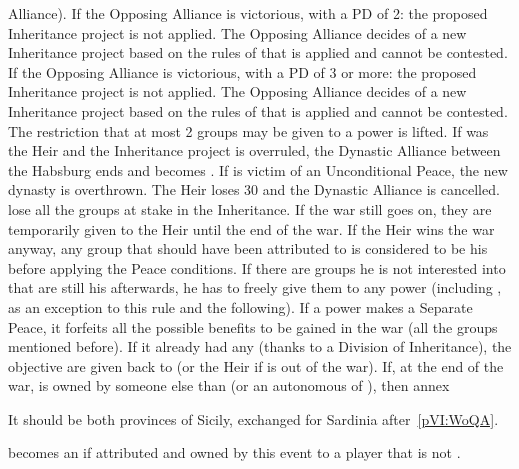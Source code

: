 \begin{digressions}
  Alliance).
  \aparag If the Opposing Alliance is victorious, with a PD of 2: the proposed
  Inheritance project is not applied. The Opposing Alliance decides of a new
  Inheritance project based on the rules of  that is applied and cannot be contested.
  \aparag If the Opposing Alliance is victorious, with a PD of 3 or more: the
  proposed Inheritance project is not applied. The Opposing Alliance decides
  of a new Inheritance project based on the rules of
   that is applied and cannot be
  contested. The restriction that at most 2 groups may be given to a power is
  lifted.
  \aparag If \HAB was the Heir and the Inheritance project is overruled, the
  Dynastic Alliance between the Habsburg ends and \AUSmin becomes \AUS.
  \aparag If \SPA is victim of an Unconditional Peace, the new dynasty is
  overthrown.
  \bparag The Heir loses 30 \PV and the Dynastic Alliance is cancelled.
  \bparag \SPA lose all the groups at stake in the Inheritance.
  \bparag If the war still goes on, they are temporarily given to the Heir
  until the end of the war.  If the Heir wins the war anyway, any group that
  should have been attributed to \SPA is considered to be his before applying
  the Peace conditions.  If there are groups he is not interested into that
  are still his afterwards, he has to freely give them to any power (including
  \SPA, as an exception to this rule and the following).
  \aparag If a power makes a Separate Peace, it forfeits all the possible
  benefits to be gained in the war (all the groups mentioned before).
  \bparag If it already had any (thanks to a Division of Inheritance), the
  objective are given back to \SPA (or the Heir if \SPA is out of the war).
  \aparag If, at the end of the war, \provinceNaples is owned by someone else
  than \HIS (or an autonomous \VASSAL of \HIS), then \paysSavoie annex
  \provinceSaldigna
  \begin{todo}
    It should be both provinces of Sicily, exchanged for Sardinia
    after~\ref{pVI:WoQA}.
  \end{todo}

  \effetlong
  \aparag \provinceGibraltar becomes an  if attributed and
  owned by this event to a player that is not \SPA.
\end{digressions}






